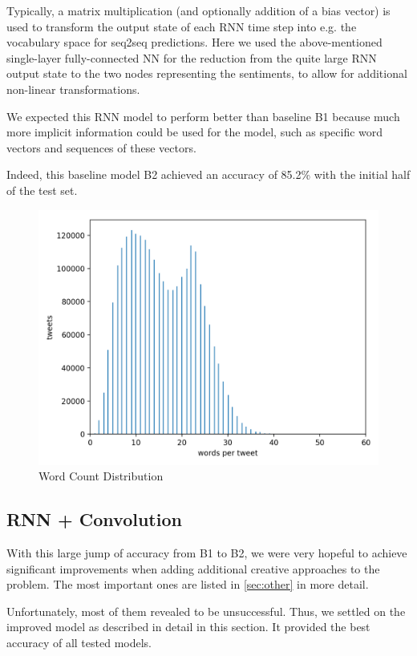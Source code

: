 \documentclass[10pt,conference,compsocconf]{IEEEtran}
\begin{document}
Typically, a matrix multiplication (and optionally addition of a bias vector) is used to
transform the output state of each RNN time step into e.g. the vocabulary space
for seq2seq predictions. Here we used the above-mentioned single-layer
fully-connected NN for the reduction from the quite large RNN output state to
the two nodes representing the sentiments, to allow for additional
non-linear transformations.

We expected this RNN model to perform better than baseline B1 because
much more implicit information could be used for the model, such as
specific word vectors and sequences of these vectors.

Indeed, this baseline model B2 achieved an accuracy of 85.2\% with the
initial half of the test set.

\begin{figure}[h!]
  \centering
  \includegraphics[scale=0.53]{word_count_histogram.png}
  \caption{Word Count Distribution}
  \label{fig:wordcount}
\end{figure}


\subsection{RNN + Convolution} \label{subsec:our-model}

With this large jump of accuracy from B1 to B2, we were very hopeful to
achieve significant improvements when adding additional
creative approaches to the problem. The most important ones are listed
in \autoref{sec:other} in more detail.

Unfortunately, most of them revealed to be unsuccessful. Thus, we settled on the
 improved model as described in detail in this section. It provided the best
 accuracy of all tested models. 
\end{document}
